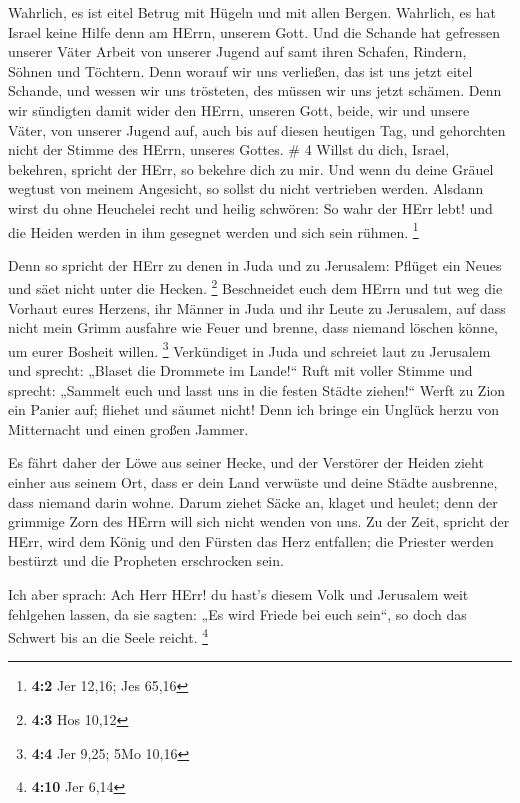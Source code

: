  Wahrlich, es ist eitel Betrug mit Hügeln und mit allen
Bergen. Wahrlich, es hat Israel keine Hilfe denn am HErrn, unserem Gott.
 Und die Schande hat gefressen unserer Väter Arbeit von
unserer Jugend auf samt ihren Schafen, Rindern, Söhnen und Töchtern.
 Denn worauf wir uns verließen, das ist uns jetzt eitel
Schande, und wessen wir uns trösteten, des müssen wir uns jetzt schämen.
Denn wir sündigten damit wider den HErrn, unseren Gott, beide, wir und
unsere Väter, von unserer Jugend auf, auch bis auf diesen heutigen Tag,
und gehorchten nicht der Stimme des HErrn, unseres Gottes. \# 4
 Willst du dich, Israel, bekehren, spricht der HErr, so
bekehre dich zu mir. Und wenn du deine Gräuel wegtust von meinem
Angesicht, so sollst du nicht vertrieben werden.  Alsdann
wirst du ohne Heuchelei recht und heilig schwören: So wahr der HErr
lebt! und die Heiden werden in ihm gesegnet werden und sich sein rühmen.
\footnote{\textbf{4:2} Jer 12,16; Jes 65,16}

 Denn so spricht der HErr zu denen in Juda und zu Jerusalem:
Pflüget ein Neues und säet nicht unter die Hecken. \footnote{\textbf{4:3}
  Hos 10,12}  Beschneidet euch dem HErrn und tut weg die
Vorhaut eures Herzens, ihr Männer in Juda und ihr Leute zu Jerusalem,
auf dass nicht mein Grimm ausfahre wie Feuer und brenne, dass niemand
löschen könne, um eurer Bosheit willen. \footnote{\textbf{4:4} Jer 9,25;
  5Mo 10,16}  Verkündiget in Juda und schreiet laut zu
Jerusalem und sprecht: „Blaset die Drommete im Lande!{}`` Ruft mit
voller Stimme und sprecht: „Sammelt euch und lasst uns in die festen
Städte ziehen!{}``  Werft zu Zion ein Panier auf; fliehet
und säumet nicht! Denn ich bringe ein Unglück herzu von Mitternacht und
einen großen Jammer.

 Es fährt daher der Löwe aus seiner Hecke, und der Verstörer
der Heiden zieht einher aus seinem Ort, dass er dein Land verwüste und
deine Städte ausbrenne, dass niemand darin wohne.  Darum
ziehet Säcke an, klaget und heulet; denn der grimmige Zorn des HErrn
will sich nicht wenden von uns.  Zu der Zeit, spricht der
HErr, wird dem König und den Fürsten das Herz entfallen; die Priester
werden bestürzt und die Propheten erschrocken sein.

 Ich aber sprach: Ach Herr HErr! du hast's diesem Volk und
Jerusalem weit fehlgehen lassen, da sie sagten: „Es wird Friede bei euch
sein``, so doch das Schwert bis an die Seele reicht. \footnote{\textbf{4:10}
  Jer 6,14}

